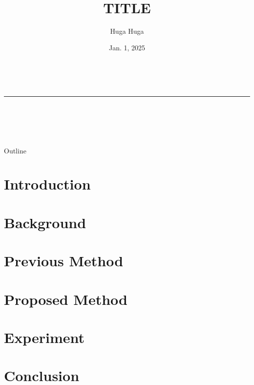 \documentclass[aspectratio=169, 10.5pt]{beamer}
\title[TITLE]{TITLE}
\institute[Hoge Hoge Lab.]{Hoge Hoge Lab.}
\author[Huga Huga]{Huga Huga}
\date[Jan. 1, 2025]{Jan. 1, 2025}
\begin{document}
\begin{frame}
	\begin{center}
		\vspace{1.0em}
		\Large
		\textbf{\inserttitle} \\
		\vspace{-1.0em}
		\noindent\textcolor{blue!20}{\rule{0.7\linewidth}{1.5pt}} \\
		\vspace{1.0em}
		\begin{minipage}{0.35\linewidth}
			\begin{center}
				\footnotesize
				\insertinstitute \\
				\insertauthor \\
				\insertdate
			\end{center}
		\end{minipage}
		\begin{minipage}{0.35\linewidth}
			\begin{center}
				\inserttitlegraphic
			\end{center}
		\end{minipage}
	\end{center}
\end{frame}

\begin{frame}{Outline}
	\tableofcontents
\end{frame}

\section{Introduction}


\section{Background}


\section{Previous Method}


\section{Proposed Method}


\section{Experiment}


\section{Conclusion}



\end{document}
